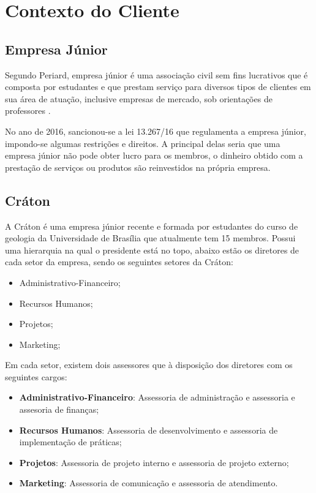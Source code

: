 \chapter{Contexto do Cliente}
  \section{Empresa Júnior}

  Segundo Periard, empresa júnior é uma associação civil sem fins lucrativos que é
  composta por estudantes e que prestam serviço para diversos tipos de clientes em sua
  área de atuação, inclusive empresas de mercado, sob orientações de professores \cite{periardej}.

  No ano de 2016, sancionou-se a lei 13.267/16 que regulamenta a empresa júnior, impondo-se
  algumas restrições e direitos. A principal delas seria que uma empresa júnior não pode obter
  lucro para os membros, o dinheiro obtido com a prestação de serviços ou produtos são reinvestidos
  na própria empresa.

  \section{Cráton}

  A Cráton é uma empresa júnior recente e formada por estudantes do curso de geologia da
  Universidade de Brasília que atualmente tem 15 membros. Possui uma hierarquia na qual o
  presidente está no topo, abaixo estão os diretores de cada setor da empresa, sendo os
  seguintes setores da Cráton:

  \begin{itemize}
    \item{Administrativo-Financeiro;}
    \item{Recursos Humanos;}
    \item{Projetos;}
    \item{Marketing;}
  \end{itemize}

  Em cada setor, existem dois assessores que à disposição dos diretores com os seguintes cargos:

  \begin{itemize}
    \item \textbf{Administrativo-Financeiro}: Assessoria de administração e assessoria
    e assesoria de finanças;
    \item \textbf{Recursos Humanos}: Assessoria de desenvolvimento e assessoria de implementação
    de práticas;
    \item \textbf{Projetos}: Assessoria de projeto interno e assessoria de projeto externo;
    \item \textbf{Marketing}: Assessoria de comunicação e assessoria de atendimento.
  \end{itemize}


